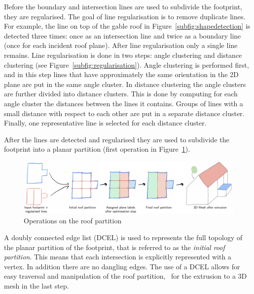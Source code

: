 Before the boundary and intersection lines are used to subdivide the footprint, they are regularised.
The goal of line regularisation is to remove duplicate lines.
For example, the line on top of the gable roof in Figure~\ref{subfig:shapedetection} is detected three times: once as an intersection line and twice as a boundary line (once for each incident roof plane).
After line regularisation only a single line remains.
Line regularisation is done in two steps: angle clustering and distance clustering (see Figure~\ref{subfig:regularisation}).
Angle clustering is performed first, and in this step lines that have approximately the same orientation in the 2D plane are put in the same angle cluster.
In distance clustering the angle clusters are further divided into distance clusters.
This is done by computing for each angle cluster the distances between the lines it contains.
Groups of lines with a small distance with respect to each other are put in a separate distance cluster.
Finally, one representative line is selected for each distance cluster.

After the lines are detected and regularised they are used to subdivide the footprint into a planar partition (first operation in Figure~\ref{fig:roofpartition}).
\begin{figure}
	\centering
	\includegraphics[width=\linewidth]{figs/roofpartition.pdf}
	\caption{Operations on the roof partition}%
	\label{fig:roofpartition}
\end{figure}
A doubly connected edge list (DCEL) is used to represents the full topology of the planar partition of the footprint, that is referred to as the \emph{initial roof partition}.
This means that each intersection is explicitly represented with a vertex.
In addition there are no dangling edges.
The use of a DCEL allows for easy traversal and manipulation of the roof partition, \eg\ for the extrusion to a 3D mesh in the last step.


